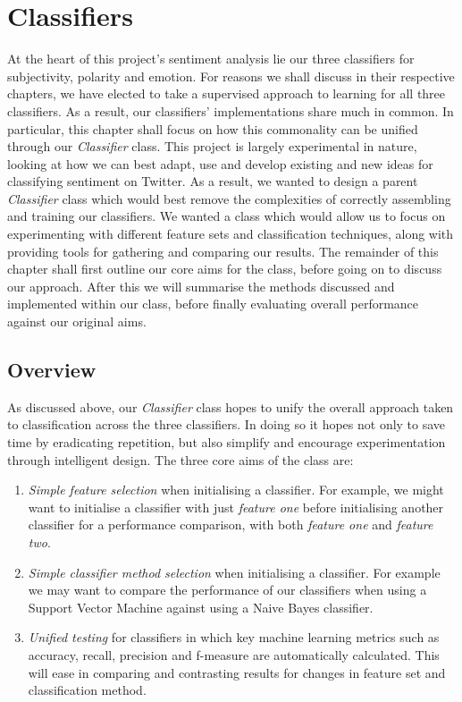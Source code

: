 \chapter{Classifiers}
\label{classifiers}

At the heart of this project's sentiment analysis lie our three classifiers for subjectivity, polarity and emotion. For reasons we shall discuss in their respective chapters, we have elected to take a supervised approach to learning for all three classifiers. As a result, our classifiers' implementations share much in common. In particular, this chapter shall focus on how this commonality can be unified through our \emph{Classifier} class. This project is largely experimental in nature, looking at how we can best adapt, use and develop existing and new ideas for classifying sentiment on Twitter. As a result, we wanted to design a parent \emph{Classifier} class which would best remove the  complexities of correctly assembling and training our classifiers. We wanted a class which would allow us to focus on experimenting with different feature sets and classification techniques, along with providing tools for gathering and comparing our results. The remainder of this chapter shall first outline our core aims for the class, before going on to discuss our approach. After this we will summarise the methods discussed and implemented within our class, before finally evaluating overall performance against our original aims.

\section{Overview}
\label{overview}

As discussed above, our \emph{Classifier} class hopes to unify the overall approach taken to classification across the three classifiers. In doing so it hopes not only to save time by eradicating repetition, but also simplify and encourage experimentation through intelligent design. The three core aims of the class are:

\begin{enumerate}
	\item \emph{Simple feature selection} when initialising a classifier. For example, we might want to initialise a classifier with just \emph{feature one} before initialising another classifier for a performance comparison, with both \emph{feature one} and \emph{feature two}.
	\item \emph{Simple classifier method selection} when initialising a classifier. For example we may want to compare the performance of our classifiers when using a Support Vector Machine against using a Naive Bayes classifier.
	\item \emph{Unified testing} for classifiers in which key machine learning metrics such as accuracy, recall, precision and f-measure are automatically calculated. This will ease in comparing and contrasting results for changes in feature set and classification method.
\end{enumerate}

